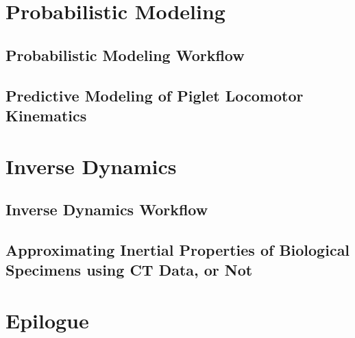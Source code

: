 \documentclass[12pt,a4paper,twoside]{report}
\newcommand\cleartoleftpage{%
  \ifodd\value{page}\else\hbox{}\cleardoublepage\fi
}
\newcommand\cleartorightpage{%
\ifodd\value{page}\hbox{}\clearpage\else\hbox{}\cleardoublepage\fi
\hbox{}
}
\begin{document}
\cleartorightpage
\part{Probabilistic Modeling}\label{pt:2}
% 

\chapter{Probabilistic Modeling Workflow}\label{cpt:statistics}


\cleartoleftpage
\chapter{Predictive Modeling of Piglet Locomotor Kinematics}\label{cpt:piglets}




\cleartorightpage
\part{Inverse Dynamics}\label{pt:3}
% 

\chapter{Inverse Dynamics Workflow}\label{cpt:dynamics_workflow}


\cleartoleftpage
\chapter[Inertial Properties]{Approximating Inertial Properties of Biological Specimens using CT Data, or Not}\label{cpt:inertials}




\cleartorightpage
\part{Epilogue}
\end{document}

